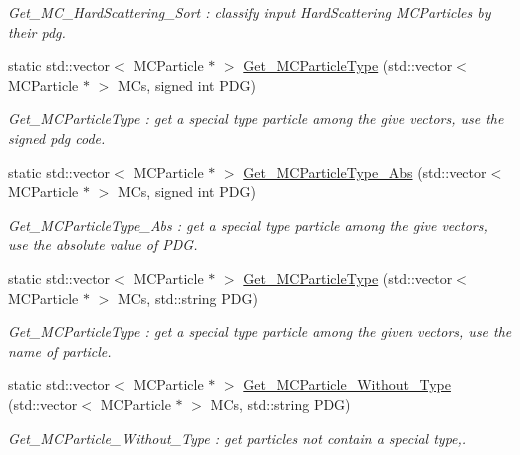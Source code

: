 \begin{DoxyCompactItemize}
\begin{DoxyCompactList}\small\item\em Get\_\-MC\_\-HardScattering\_\-Sort : classify input HardScattering MCParticles by their pdg. \item\end{DoxyCompactList}\item 
static std::vector$<$ MCParticle $\ast$ $>$ \hyperlink{classToolSet_1_1CMC_a0595ad7853b51cfc631547665a3cb63e}{Get\_\-MCParticleType} (std::vector$<$ MCParticle $\ast$ $>$ MCs, signed int PDG)
\begin{DoxyCompactList}\small\item\em Get\_\-MCParticleType : get a special type particle among the give vectors, use the signed pdg code. \item\end{DoxyCompactList}\item 
static std::vector$<$ MCParticle $\ast$ $>$ \hyperlink{classToolSet_1_1CMC_a8a83c548d4fa19b657194f055f5084db}{Get\_\-MCParticleType\_\-Abs} (std::vector$<$ MCParticle $\ast$ $>$ MCs, signed int PDG)
\begin{DoxyCompactList}\small\item\em Get\_\-MCParticleType\_\-Abs : get a special type particle among the give vectors, use the absolute value of PDG. \item\end{DoxyCompactList}\item 
static std::vector$<$ MCParticle $\ast$ $>$ \hyperlink{classToolSet_1_1CMC_a186078318b357a23930ab6b61c8d9494}{Get\_\-MCParticleType} (std::vector$<$ MCParticle $\ast$ $>$ MCs, std::string PDG)
\begin{DoxyCompactList}\small\item\em Get\_\-MCParticleType : get a special type particle among the given vectors, use the name of particle. \item\end{DoxyCompactList}\item 
static std::vector$<$ MCParticle $\ast$ $>$ \hyperlink{classToolSet_1_1CMC_ac1523c9e38e6453d4980145012bdc75b}{Get\_\-MCParticle\_\-Without\_\-Type} (std::vector$<$ MCParticle $\ast$ $>$ MCs, std::string PDG)
\begin{DoxyCompactList}\small\item\em Get\_\-MCParticle\_\-Without\_\-Type : get particles not contain a special type,. \item\end{DoxyCompactList}\item 

\end{DoxyCompactItemize}
